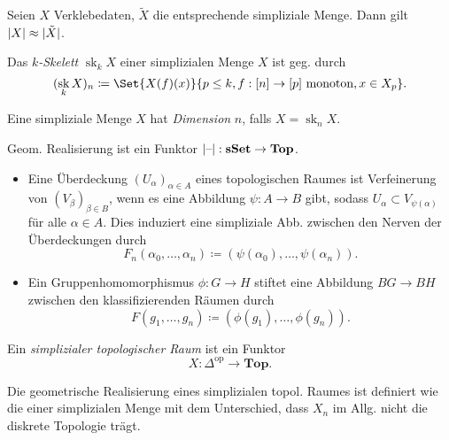 \documentclass{cheat-sheet}
\newcommand{\sSet}{\mathbf{sSet}} %
\newcommand{\Top}{\mathbf{Top}} %
\newcommand{\op}{\mathrm{op}} %
\DeclareMathOperator{\sk}{sk} %
\begin{document}
\begin{prop}
  Seien $X$ Verklebedaten, $\tilde{X}$ die entsprechende simpliziale Menge. Dann gilt $\lvert X\rvert \approx \lvert\tilde{X}\rvert$.
\end{prop}

\begin{defn}
  Das \emph{$k$-Skelett} $\sk_k X$ einer simplizialen Menge $X$ ist geg. durch
  \[ (\sk_k X)_n \coloneqq \Set{ X(f)(x) }{ p \leq k, f : [n] \to [p] \text{ monoton}, x \in X_p }. \]
\end{defn}

\begin{defn}
  Eine simpliziale Menge $X$ hat \emph{Dimension} $n$, falls $X = \sk_n X$.
\end{defn}

\begin{prop}
  Geom. Realisierung ist ein Funktor $\abs{\blank} : \sSet \to \Top$.
\end{prop}

\begin{bspe}
  \begin{itemize}
    \item Eine Überdeckung $(U_\alpha)_{\alpha \in A}$ eines topologischen Raumes ist Verfeinerung von $(V_\beta)_{\beta \in B}$, wenn es eine Abbildung $\psi : A \to B$ gibt, sodass $U_\alpha \subset V_{\psi(\alpha)}$ für alle $\alpha \in A$. Dies induziert eine simpliziale Abb. zwischen den Nerven der Überdeckungen durch
    \[ F_n(\alpha_0, \ldots, \alpha_n) \coloneqq (\psi(\alpha_0), \ldots, \psi(\alpha_n)). \]
    \item Ein Gruppenhomomorphismus $\phi : G \to H$ stiftet eine Abbildung $BG \to BH$ zwischen den klassifizierenden Räumen durch
    \[ F(g_1, \ldots, g_n) \coloneqq (\phi(g_1), \ldots, \phi(g_n)). \]
  \end{itemize}
\end{bspe}


\begin{defn}
  Ein \emph{simplizialer topologischer Raum} ist ein Funktor
  \[ X : \Delta^\op \to \Top. \]
\end{defn}

\begin{bem}
  Die geometrische Realisierung eines simplizialen topol. Raumes ist definiert wie die einer simplizialen Menge mit dem Unterschied, dass $X_n$ im Allg. nicht die diskrete Topologie trägt.
\end{bem}
\end{document}
